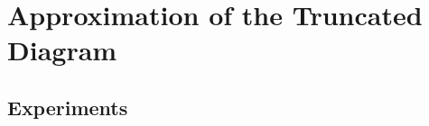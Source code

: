 \documentclass[12pt]{article}
\begin{document}
\clearpage
\section{Approximation of the Truncated Diagram}
  

  \subsection{Experiments}
    





% 
%
% 
%
%
% 

\end{document}
